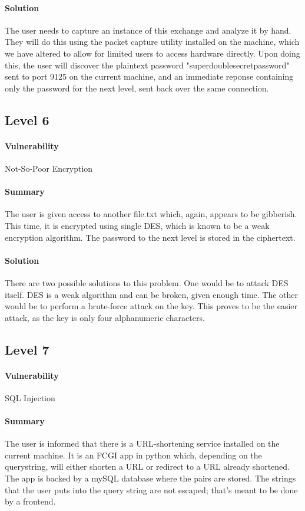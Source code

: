 \documentclass[12pt]{article}
\begin{document}
\paragraph{Solution}  The user needs to capture an instance of this exchange and analyze it by hand.
They will do this using the packet capture utility installed on the machine, which we have altered
to allow for limited users to access hardware directly.  Upon doing this, the user will discover
the plaintext password "superdoublesecretpassword" sent to port 9125 on the current machine,
and an immediate reponse containing only the password for the next level, sent back over the same
connection.
\subsection{Level 6}
\paragraph{Vulnerability} Not-So-Poor Encryption
\paragraph{Summary} The user is given access to another file.txt which, again, appears to be gibberish.  This time, it is encrypted using single DES, which is known to be a weak encryption algorithm. The password to the next level is stored in the ciphertext. 
\paragraph{Solution} There are two possible solutions to this problem.  One would be to attack DES itself.  DES is a weak algorithm and can be broken, given enough time.  The other would be to perform a brute-force attack on the key.  This proves to be the easier attack, as the key is only four alphanumeric characters.

\subsection{Level 7}
\paragraph{Vulnerability} SQL Injection
\paragraph{Summary} The user is informed that there is a URL-shortening service installed on the current
machine.  It is an FCGI app in python which, depending on the querystring, will either shorten a URL
or redirect to a URL already shortened.  The app is backed by a mySQL database where the pairs are stored.
The strings that the user puts into the query string are not escaped; that's meant to be done by a frontend.
\end{document}
